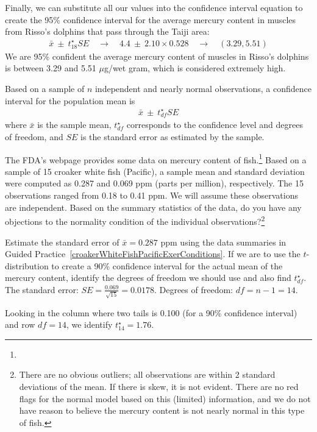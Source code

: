 Finally, we can substitute all our values into the confidence interval equation to create the 95\% confidence interval for the average mercury content in muscles from Risso's dolphins that pass through the Taiji area:
\begin{eqnarray*}
\bar{x} \ \pm\  t^{\star}_{18}SE
	\quad \to \quad
4.4 \ \pm\  2.10 \times 0.528
	\quad \to \quad
(3.29, 5.51)
\end{eqnarray*}
We are 95\% confident the average mercury content of muscles in Risso's dolphins is between 3.29 and 5.51 $\mu$g/wet gram, which is considered extremely high.


\begin{termBox}{
Based on a sample of $n$ independent and nearly normal observations, a confidence interval for the population mean is
\begin{eqnarray*}
\bar{x} \ \pm\  t^{\star}_{df}SE
\end{eqnarray*}
where $\bar{x}$ is the sample mean, $t^{\star}_{df}$ corresponds to the confidence level and degrees of freedom, and $SE$ is the standard error as estimated by the sample.}
\end{termBox}

\textC{\pagebreak}

\begin{exercise} \label{croakerWhiteFishPacificExerConditions}
The FDA's webpage provides some data on mercury content of fish.\footnote{} Based on a sample of 15 croaker white fish (Pacific), a sample mean and standard deviation were computed as 0.287 and 0.069 ppm (parts per million), respectively. The 15 observations ranged from 0.18 to 0.41 ppm. We will assume these observations are independent. Based on the summary statistics of the data, do you have any objections to the normality condition of the individual observations?\footnote{There are no obvious outliers; all observations are within 2 standard deviations of the mean. If there is skew, it is not evident. There are no red flags for the normal model based on this (limited) information, and we do not have reason to believe the mercury content is not nearly normal in this type of fish.}
\end{exercise}

\begin{example}{Estimate the standard error of $\bar{x}=0.287$ ppm using the data summaries in Guided Practice~\ref{croakerWhiteFishPacificExerConditions}. If we are to use the $t$-distribution to create a 90\% confidence interval for the actual mean of the mercury content, identify the degrees of freedom we should use and also find $t^{\star}_{df}$.}
\label{croakerWhiteFishPacificExerSEDFTStar}
The standard error: $SE = \frac{0.069}{\sqrt{15}} = 0.0178$. Degrees of freedom: $df = n - 1 = 14$.

Looking in the column where two tails is 0.100 (for a 90\% confidence interval) and row $df=14$, we identify $t^{\star}_{14} = 1.76$.
\end{example}


